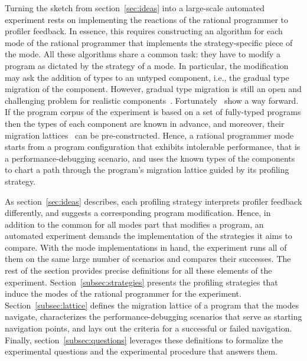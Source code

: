 
Turning the sketch from section~\ref{sec:ideas} into a large-scale
automated experiment rests on implementing the reactions of the rational
programmer to profiler feedback. In essence, this requires constructing an
algorithm for each mode of the rational programmer that implements the
strategy-specific piece of the mode. All these algorithms share a  common
task: they have to modify a program as dictated by the
strategy of a mode.  In particular, the modification may ask the addition
of types to an untyped component, i.e., the gradual type migration of the
component.  However, gradual type migration is still an open and challenging
problem for realistic components~\cite{rch:in-out-infer-gt,
mp:gt-decidable, ccew:gt-migrate, msi:gt-infer-hm, gc:gt-infer,
cagg-solver-based-migration, km:ts-type-evo}.
Fortunately~\citep{lgfd-icfp-2021} show a way forward. If the program
corpus of the experiment is based on a set of fully-typed programs then
the types of each component are known in advance, and moreover, their
migration  lattices~\citep{tfgnvf-popl-2016} can be pre-constructed.
Hence, a rational programmer mode starts from a program configuration
that exhibits intolerable performance, that is a performance-debugging
scenario, and uses the known types of the components to chart a path
through the program's migration lattice guided by its profiling strategy.

As section~\ref{sec:ideas} describes, each profiling strategy interprets
profiler feedback differently, and suggests a corresponding program
modification. Hence, in addition to the common for all modes part that
modifies a program, an automated experiment demands the implementation
of the strategies it aims to compare. With the mode implementations in
hand, the experiment runs all of them on the same large number of
scenarios and compares their successes. The rest of the section provides
precise definitions for all these elements of the experiment.
Section~\ref{subsec:strategies} presents the profiling strategies that induce the
modes of the rational programmer for the experiment.
Section~\ref{subsec:lattice} defines the migration lattice of a program
that the modes navigate, characterizes the performance-debugging
scenarios that serve as starting navigation points, and lays out  the
criteria for a successful or failed navigation. Finally,
section~\ref{subsec:questions} leverages these definitions to formalize
the experimental questions and the experimental procedure that answers
them.

